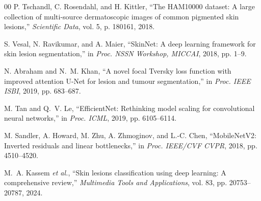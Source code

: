 \documentclass[10pt,twocolumn]{article}
\begin{document}
\begin{thebibliography}{00}
P. Tschandl, C. Rosendahl, and H. Kittler, ``The HAM10000 dataset: A large collection of multi-source dermatoscopic images of common pigmented skin lesions,'' \textit{Scientific Data}, vol. 5, p. 180161, 2018.

S. Vesal, N. Ravikumar, and A. Maier, ``SkinNet: A deep learning framework for skin lesion segmentation,'' in \textit{Proc. NSSN Workshop, MICCAI}, 2018, pp. 1--9.

N. Abraham and N.~M. Khan, ``A novel focal Tversky loss function with improved attention U-Net for lesion and tumour segmentation,'' in \textit{Proc. IEEE ISBI}, 2019, pp. 683--687.

M. Tan and Q.~V. Le, ``EfficientNet: Rethinking model scaling for convolutional neural networks,'' in \textit{Proc. ICML}, 2019, pp. 6105--6114.

M. Sandler, A. Howard, M. Zhu, A. Zhmoginov, and L.-C. Chen, ``MobileNetV2: Inverted residuals and linear bottlenecks,'' in \textit{Proc. IEEE/CVF CVPR}, 2018, pp. 4510--4520.

M.~A. Kassem \textit{et al.}, ``Skin lesions classification using deep learning: A comprehensive review,'' \textit{Multimedia Tools and Applications}, vol. 83, pp. 20753--20787, 2024.

\end{thebibliography}
\end{document}
